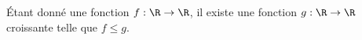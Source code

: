 Étant donné une fonction $f : \R \to \R$, il existe une fonction $g : \R \to \R$ croissante telle que $f \leq g$.

\begin{reponses}
\end{reponses}

